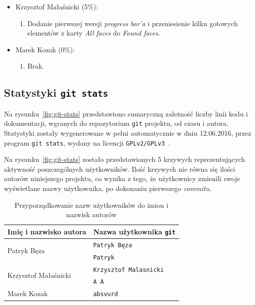 \documentclass[a4paper,titlepage]{article}
\theoremstyle{break}
\numberwithin{equation}{subsection}
\begin{document}
\begin{appendices}
\begin{itemize}
\begin{enumerate}
	\end{enumerate}
\item Krzysztof Małaśnicki (5\%):
	\begin{enumerate}
		\item Dodanie pierwszej wersji \emph{progress bar'a} i przeniesienie kilku gotowych elementów z karty \emph{All faces} do \emph{Found faces}.
	\end{enumerate}
\item Marek Kozak (0\%):
	\begin{enumerate}
		\item Brak.
	\end{enumerate}
\end{itemize}

\end{appendices}

\subsection{Statystyki \texttt{git stats}}

Na rysunku~\ref{fig:git-stats} przedstawiono sumaryczną zależność liczby linii kodu i dokumentacji, wgranych do repozytorium \texttt{git} projektu, od czasu i autora. Statystyki zostały wygenerowane w pełni automatycznie w dniu 12.06.2016, przez program \texttt{git~stats}, wydany na licencji \texttt{GPLv2/GPLv3}~\cite{www:git-stats}.

Na rysunku~\ref{fig:git-stats} zostało przedstawionych 5 krzywych reprezentujących aktywność poszczególnych użytkowników. Ilość krzywych nie równa się ilości autorów niniejszego projektu, co wynika z tego, że użytkownicy zmienili swoje wyświetlane nazwy użytkownika, po dokonaniu pierwszego \emph{commitu}.

\begin{table}[H]
\centering
\begin{tabular}{l|l}
Imię i nazwisko autora & Nazwa użytkownika \texttt{git}\\\hline\hline
\multirow{2}{*}{Patryk Bęza} & \texttt{Patryk Bęza}\\\cline{2-2}
& \texttt{Patryk}\\\hline
\multirow{2}{*}{Krzysztof Małaśnicki} & \texttt{Krzysztof Malasnicki}\\\cline{2-2}
& \texttt{A A}\\\hline
Marek Kozak & \texttt{absvurd}
\end{tabular}
\caption{Przyporządkowanie nazw użytkowników do imion i nazwisk autorów}
\end{table}
\end{document}
